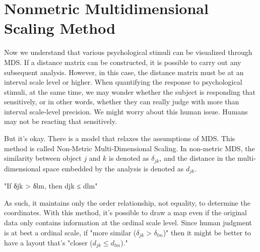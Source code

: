 \documentclass{ltjsbook}
\begin{document}
\section{Nonmetric Multidimensional Scaling Method}

Now we understand that various psychological stimuli can be visualized through MDS. If a distance matrix can be constructed, it is possible to carry out any subsequent analysis.
However, in this case, the distance matrix must be at an interval scale level or higher.
When quantifying the response to psychological stimuli, at the same time, we may wonder whether the subject is responding that sensitively, or in other words, whether they can really judge with more than interval scale-level precision. We might worry about this human issue. Humans may not be reacting that sensitively.

But it's okay. There is a model that relaxes the assumptions of MDS. This method is called Non-Metric Multi-Dimensional Scaling. In non-metric MDS, the similarity between object $j$ and $k$ is denoted as $\delta_{jk}$, and the distance in the multi-dimensional space embedded by the analysis is denoted as $d_{jk}$.

"If δjk > δlm, then djk ≤ dlm"

As such, it maintains only the order relationship, not equality, to determine the coordinates. With this method, it's possible to draw a map even if the original data only contains information at the ordinal scale level. Since human judgment is at best a ordinal scale, if "more similar ($\delta_{jk} > \delta_{lm}$)" then it might be better to have a layout that's "closer ($d_{jk}\le d_{lm}$)."
\end{document}
